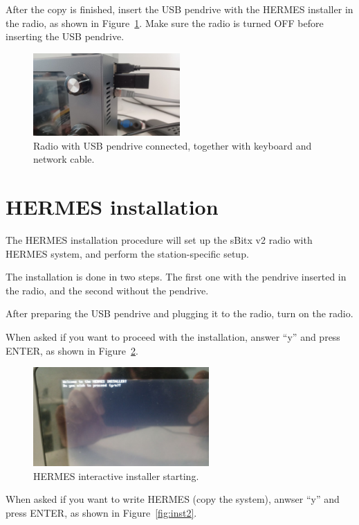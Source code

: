 \documentclass[11pt,a4paper]{article}
\begin{document}
After the copy is finished, insert the USB pendrive with the HERMES installer in the radio, as shown in Figure~\ref{fig:pen1}.
Make sure the radio is turned OFF before inserting the USB pendrive.


\begin{figure}[H]
  \centering
  \includegraphics[width=0.5\textwidth]{pictures/usb-1.jpeg}
  \caption{Radio with USB pendrive connected, together with keyboard and network cable.}
  \label{fig:pen1}
\end{figure}


\section{HERMES installation}

The HERMES installation procedure will set up the sBitx v2 radio with HERMES system,
and perform the station-specific setup.

The installation is done in two steps. The first one with the
pendrive inserted in the radio, and the second without the pendrive.

After preparing the USB pendrive and plugging it to the radio, turn on the radio.

When asked if you want to proceed with the installation, answer ``y'' and press ENTER, as shown in Figure~\ref{fig:inst1}.

\begin{figure}[H]
  \centering
  \includegraphics[width=0.6\textwidth]{pictures/inst-1.jpg}
  \caption{HERMES interactive installer starting.}
  \label{fig:inst1}
\end{figure}

When asked if you want to write HERMES (copy the system), anwser ``y'' and press ENTER, as shown in Figure~\ref{fig:inst2}.
\end{document}
